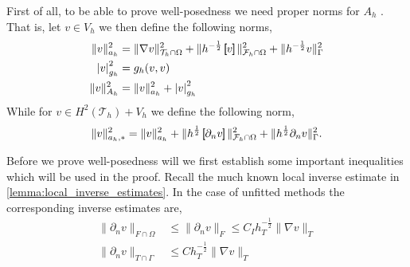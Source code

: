 First of all, to be able to prove well-posedness we need proper norms for $A_{h}$ .
That is, let $v \in V_{h}$ we then define the following norms,
\[
\begin{split}
    \| v \|_{ a_{h} }^{ 2 }  & = \| \nabla v \|_{ \mathcal{T} _{h} \cap \Omega  }^{ 2 } + \| h^{-\frac{1}{2}} \left[\!\!\left[  v  \right]\!\!\right]   \|_{ \mathcal{F} _{h} \cap \Omega   }^2 + \| h^{-\frac{1}{2} } v \|_{ \Gamma  }^{ 2 }   \\
    \left\lvert v \right\rvert _{g_{h}}^{2} & = g_{h}( v,v)  \\
    \| v \|_{ A_{h} }^{ 2 } &= \| v \|_{ a_{h} }^{ 2 } + \left\lvert v \right\rvert_{g_{h}}^{2}     \\
\end{split}
\]
While for $v \in H^2( \mathcal{T} _{h}) + V_{h}$ we define the following norm,\[
\| v \|_{ a_{h},* }^{ 2 } = \| v \|_{ a_{h} }^{ 2 } +   \| h^{\frac{1}{2}} \left[\!\!\left[  \partial _{n} v  \right]\!\!\right]    \|_{  \mathcal{F} _{h} \cap \Omega }^{  2} + \| h^{\frac{1}{2}} \partial _{n} v \|_{ \Gamma  }^{ 2 }.
\]

Before we prove well-posedness will we first establish some important inequalities which will be used in the proof.
Recall the much known local inverse estimate in \ref{lemma:local_inverse_estimates}. In the case of unfitted methods the corresponding inverse estimates are,
\begin{equation}
\label{eq:unfitted_localinv}
\begin{split}
    \| \partial _{n} v \|_{ F\cap \Omega  }^{  } & \le \| \partial _{n}  v \|_{F  }^{  } \le  C_{I} h_{T} ^{-\frac{1}{2}} \| \nabla v \|_{ T }^{  } \\
    \| \partial _{n} v \|_{ T\cap \Gamma   }^{  } &  \le  C h_{T} ^{-\frac{1}{2}} \| \nabla v \|_{ T }^{  } \\
\end{split}
\end{equation}


